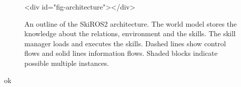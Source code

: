 \begin{figure}[tpb]
	{
		\setlength{\fboxrule}{0pt}
	}
	\caption{An outline of the SkiROS2 architecture. The world model stores the knowledge about the relations, environment and the skills. The skill manager loads and executes the skills. Dashed lines show control flows and solid lines information flows. Shaded blocks indicate possible multiple instances.}
	<div id="fig-architecture"></div>

\end{figure}

ok